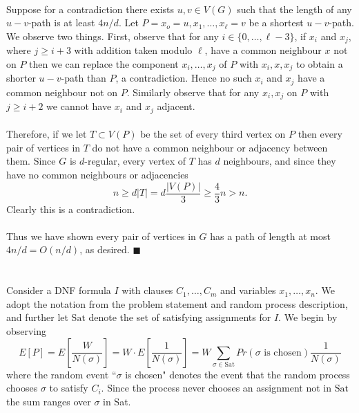 \documentclass[letterpaper,12pt,oneside,onecolumn]{article}
\begin{document}
	\paragraph{}
	Suppose for a contradiction there exists $u,v \in V(G)$ such that the length of any $u-v$-path is at least $4n/d$. Let $P=x_o=u, x_1, \dots, x_\ell=v$ be a shortest $u-v$-path. We observe two things. First, observe that for any $i \in \{0,\dots, \ell-3\}$, if $x_i$ and $x_{j}$, where $j \geq i+3$ with addition taken modulo $\ell$, have a common neighbour $x$ not on $P$ then we can replace the component $x_i,\dots, x_j$ of $P$ with $x_i, x, x_{j}$ to obtain a shorter $u-v$-path than $P$, a contradiction. Hence no such $x_i$ and $x_{j}$ have a common neighbour not on $P$. Similarly observe that for any $x_i, x_j$ on $P$ with $j \geq i+2$ we cannot have $x_i$ and $x_j$ adjacent. 
	\paragraph{}
	Therefore, if we let $T\subset V(P)$ be the set of every third vertex on $P$ then every pair of vertices in $T$ do not have a common neighbour or adjacency between them. Since $G$ is $d$-regular, every vertex of $T$ has $d$ neighbours, and since they have no common neighbours or adjacencies
	$$n \geq d|T| =d\frac{|V(P)|}{3} \geq \frac{4}{3}n > n.$$
	Clearly this is a contradiction.
	\paragraph{}
	Thus we have shown every pair of vertices in $G$ has a path of length at most $4n/d = O(n/d)$, as desired. $\blacksquare$
	\newpage
	\section{}
	\paragraph{}
	
	\newpage
	\section{}
	\paragraph{}
	Consider a DNF formula $I$ with clauses $C_1, \dots, C_m$ and variables $x_1, \dots, x_n$. We adopt the notation from the problem statement and random process description, and further let $\text{Sat}$ denote the set of satisfying assignments for $I$. We begin by observing
	$$E[P] = E[\frac{W}{N(\sigma)}] = W\cdot E[\frac{1}{N(\sigma)}] = W\sum_{\sigma \in \text{Sat}} Pr(\sigma \text{ is chosen})\frac{1}{N(\sigma)}$$
	where the random event ``$\sigma$ is chosen" denotes the event that the random process chooses $\sigma$ to satisfy $C_i$. Since the process never chooses an assignment not in $\text{Sat}$ the sum ranges over $\sigma$ in Sat.
\end{document}
